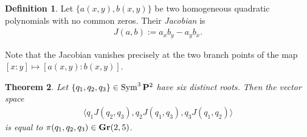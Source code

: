 \documentclass[11pt,reqno]{amsart}
\theoremstyle{plain}
\newtheorem{theorem}{Theorem}[section]
\theoremstyle{definition}
\newtheorem{definition}[theorem]{Definition}
\theoremstyle{remark}
\numberwithin{equation}{section}
\numberwithin{equation}{section}
\begin{document}
\begin{definition}
  \label{definition:jacobiantwoquadrics}
  Let $\{a(x,y),b(x,y)\}$ be two homogeneous quadratic polynomials with no common zeros. Their {\sl Jacobian} is
  \begin{align*}
    J(a,b):= a_{x}b_{y}-a_{y}b_{x}.
  \end{align*}

\end{definition}

Note that the Jacobian vanishes precisely at the two branch points of the map $[x : y] \mapsto [a(x,y):b(x,y)]$.

\begin{theorem}
  \label{theorem:onlyapencil}
  Let $\left\{ q_{1},q_{2},q_{3} \right\} \in \operatorname{Sym}^{3}{\bf P}^{2}$ have six distinct roots. Then the vector space
  \begin{align*}
    \langle q_{1}J(q_{2},q_{3}), q_{2}J(q_{1},q_{3}), q_{3}J(q_{1},q_{2}) \rangle 
  \end{align*}
  is equal to  $\pi(q_{1},q_{2},q_{3}) \in {\bf Gr}(2,5)$.
\end{theorem}
\end{document}
